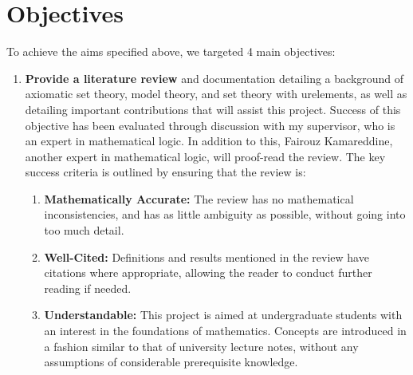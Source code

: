 \documentclass[11pt]{report}
\theoremstyle{definition}
\theoremstyle{theorem}
\theoremstyle{lemma}
\begin{document}
\section{Objectives}\label{objectives}
To achieve the aims specified above, we targeted 4 main objectives:
\begin{enumerate}
  \item \textbf{Provide a literature review} and documentation detailing a background of axiomatic set theory, model theory, and set theory with urelements, as well as detailing important contributions that will assist this project.
  Success of this objective has been evaluated through discussion with my supervisor, who is an expert in mathematical logic.
  In addition to this, Fairouz Kamareddine, another expert in mathematical logic, will proof-read the review.  
  The key success criteria is outlined by ensuring that the review is:
  \begin{enumerate}
    \item \textbf{Mathematically Accurate:} The review has no mathematical inconsistencies, and has as little ambiguity as possible, without going into too much detail. 
    \item \textbf{Well-Cited:} Definitions and results mentioned in the review have citations where appropriate, allowing the reader to conduct further reading if needed. 
    \item \textbf{Understandable:} This project is aimed at undergraduate students with an interest in the foundations of mathematics. Concepts are introduced in a fashion similar to that of university lecture notes, without any assumptions of considerable prerequisite knowledge. 
  \end{enumerate} 


\end{enumerate}
\end{document}
